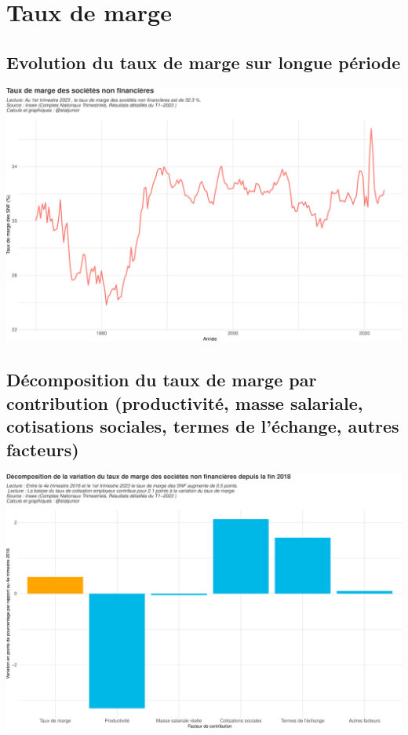 \documentclass[
  paper=a4,
  ,captions=tableheading
]{scrartcl}
\begin{document}
\newpage

\hypertarget{taux-de-marge}{%
\section{Taux de marge}\label{taux-de-marge}}

\hypertarget{evolution-du-taux-de-marge-sur-longue-puxe9riode}{%
\subsection{Evolution du taux de marge sur longue
période}\label{evolution-du-taux-de-marge-sur-longue-puxe9riode}}

\includegraphics{rapport_pdf_compte_branche_files/figure-latex/unnamed-chunk-20-1.pdf}

\hypertarget{duxe9composition-du-taux-de-marge-par-contribution-productivituxe9-masse-salariale-cotisations-sociales-termes-de-luxe9change-autres-facteurs}{%
\subsection{Décomposition du taux de marge par contribution
(productivité, masse salariale, cotisations sociales, termes de
l'échange, autres
facteurs)}\label{duxe9composition-du-taux-de-marge-par-contribution-productivituxe9-masse-salariale-cotisations-sociales-termes-de-luxe9change-autres-facteurs}}

\includegraphics{rapport_pdf_compte_branche_files/figure-latex/unnamed-chunk-21-1.pdf}
\end{document}
